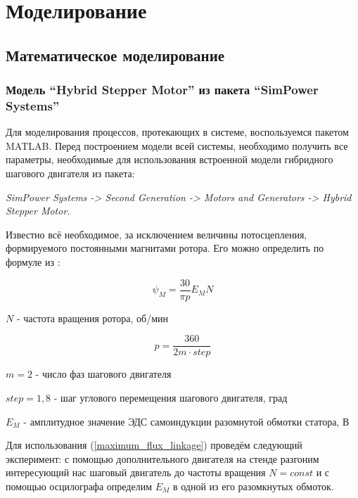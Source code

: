 \newpage
\section{Моделирование}

\subsection{Математическое моделирование}

\subsubsection{Модель ``Hybrid Stepper Motor'' из пакета ``SimPower Systems''}

Для моделирования процессов, протекающих в системе, воспользуемся пакетом MATLAB.
Перед построением модели всей системы, необходимо получить все параметры,
необходимые для использования встроенной модели гибридного шагового двигателя из пакета:

\textit{SimPower Systems -> Second Generation -> Motors and Generators -> Hybrid Stepper Motor.}

Известно всё необходимое, за исключением величины потосцепления, формируемого
постоянными магнитами ротора. Его можно определить по формуле 
из \cite{Matlab_help_stepper_motor}:

\begin{equation}
    \label{maximum_flux_linkage}
    \psi_{M} = \frac{30}{\pi p} E_{M} N
\end{equation}

$N$ - частота вращения ротора, об/мин

$$
    p = \frac{360}{2m \cdot step}
$$

$m = 2$ - число фаз шагового двигателя

$step = 1,8$ - шаг углового перемещения шагового двигателя, град

$E_{M}$ - амплитудное значение ЭДС самоиндукции разомнутой обмотки статора, В

Для использования (\ref{maximum_flux_linkage}) проведём следующий эксперимент:
с помощью дополнительного двигателя на стенде разгоним интересующий нас шаговый 
двигатель до частоты вращения $N = const$ и с помощью осцилографа определим $E_{M}$
в одной из его разомкнутых обмоток.

